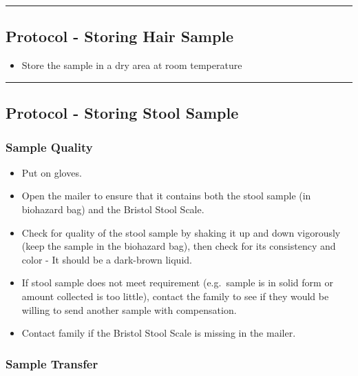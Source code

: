 \documentclass[]{book}
\providecommand{\tightlist}{%
  \setlength{\itemsep}{0pt}\setlength{\parskip}{0pt}}
\begin{document}
\begin{center}\rule{0.5\linewidth}{0.5pt}\end{center}

\hypertarget{protocol---storing-hair-sample}{%
\subsection{Protocol - Storing Hair Sample}\label{protocol---storing-hair-sample}}

\begin{itemize}
\tightlist
\item
  Store the sample in a dry area at room temperature
\end{itemize}

\begin{center}\rule{0.5\linewidth}{0.5pt}\end{center}

\hypertarget{protocol---storing-stool-sample}{%
\subsection{Protocol - Storing Stool Sample}\label{protocol---storing-stool-sample}}

\hypertarget{sample-quality}{%
\subsubsection{Sample Quality}\label{sample-quality}}

\begin{itemize}
\tightlist
\item
  Put on gloves.
\item
  Open the mailer to ensure that it contains both the stool sample (in biohazard bag) and the Bristol Stool Scale.
\item
  Check for quality of the stool sample by shaking it up and down vigorously (keep the sample in the biohazard bag), then check for its consistency and color - It should be a dark-brown liquid.
\item
  If stool sample does not meet requirement (e.g.~sample is in solid form or amount collected is too little), contact the family to see if they would be willing to send another sample with compensation.
\item
  Contact family if the Bristol Stool Scale is missing in the mailer.
\end{itemize}

\hypertarget{sample-transfer}{%
\subsubsection{Sample Transfer}\label{sample-transfer}}
\end{document}
